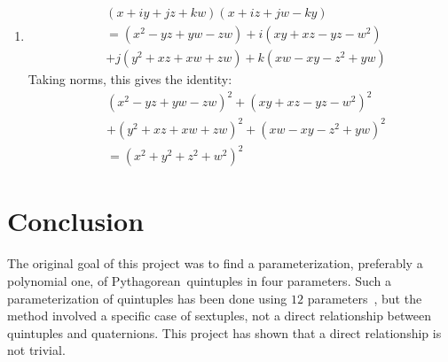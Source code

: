 \documentclass[12pt]{article}
\theoremstyle{definition}
\numberwithin{equation}{section}
\begin{document}
\begin{enumerate}[{Identity} I:]
\item
    \begin{align*}
    &(x + iy + jz + kw)(x + iz + jw - ky) \\
    &= (x^2 - yz + yw - zw ) + i(xy + xz - yz - w^2) \\
        &+ j(y^2 + xz + xw + zw) + k(xw - xy - z^2  + yw) 
    \end{align*}
Taking norms, this gives the identity:
    \begin{align*}
    &(x^2 - yz + yw - zw )^2 + (xy + xz - yz - w^2)^2 \\
        &+ (y^2 + xz + xw + zw)^2 + (xw - xy - z^2  + yw)^2 \\
    &= (x^2 + y^2 + z^2 + w^2)^2
    \end{align*}
\end{enumerate}











\section{Conclusion}



The original
goal of this project was to find a parameterization, preferably a polynomial one,  of 
Pythagorean~quintuples in four parameters.
Such a parameterization of quintuples
has been done using $12$ parameters~\cite{Polynomial_parametrization},
but the method involved a
specific case of sextuples, not a direct relationship between 
quintuples and quaternions. 
This project has shown that a
direct relationship is not trivial.
\end{document}
